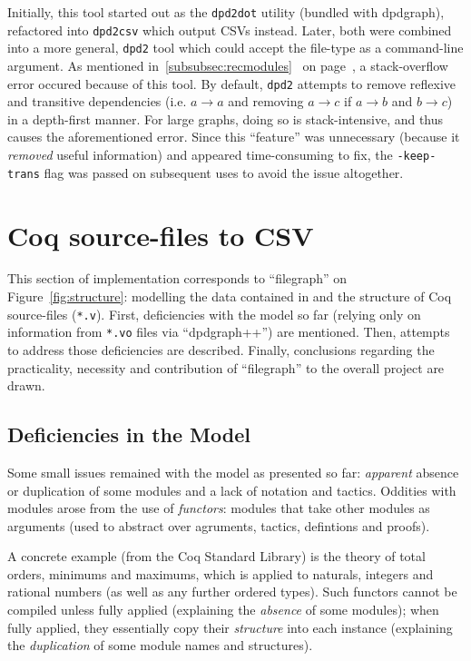 Initially, this tool started out as the \texttt{dpd2dot} utility (bundled with
dpdgraph), refactored into \texttt{dpd2csv} which output CSVs instead. Later,
both were combined into a more general, \texttt{dpd2} tool which could accept
the file-type as a command-line argument. As mentioned
in~\ref{subsubsec:recmodules}~ on
page~\pageref{subsubsec:recmodules}, a stack-overflow error occured because of
this tool. By default, \texttt{dpd2} attempts to remove reflexive and
transitive dependencies (i.e. $a \rightarrow a$ and removing $a \rightarrow c$
if $a \rightarrow b$ and $b \rightarrow c$) in a depth-first manner.  For large
graphs, doing so is stack-intensive, and thus causes the aforementioned error.
Since this ``feature'' was unnecessary (because it \emph{removed} useful
information) and appeared time-consuming to fix, the \texttt{-keep-trans} flag
was passed on subsequent uses to avoid the issue altogether.

\section{Coq source-files to CSV}

This section of implementation corresponds to ``filegraph'' on
Figure~\ref{fig:structure}: modelling the data contained in and the structure of
Coq source-files (\texttt{*.v}). First, deficiencies with the model so far
(relying only on information from \texttt{*.vo} files via ``dpdgraph++'') are
mentioned. Then, attempts to address those deficiencies are described. Finally,
conclusions regarding the practicality, necessity and contribution of
``filegraph'' to the overall project are drawn.

\subsection{Deficiencies in the Model}

Some small issues remained with the model as presented so far: \emph{apparent}
absence or duplication of some modules and a lack of notation and tactics.
Oddities with modules arose from the use of \emph{functors}: modules that take
other modules as arguments (used to abstract over agruments, tactics,
defintions and proofs).

A concrete example (from the Coq Standard Library) is the theory of total
orders, minimums and maximums, which is applied to naturals, integers and
rational numbers (as well as any further ordered types). Such functors cannot be
compiled unless fully applied (explaining the \emph{absence} of some modules);
when fully applied, they essentially copy their \emph{structure} into each
instance (explaining the \emph{duplication} of some module names and
structures).

